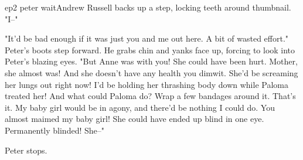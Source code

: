 \documentclass{book}
\begin{document}
\begin{childnode}{ep2 peter wait}{Andrew Russell}
    \name{} backs up a step, locking \hisher{} teeth around \hisher{} thumbnail. "I--"

    "It'd be bad enough if it was just you and me out here. A bit of wasted effort." Peter's boots step forward. He grabs \names{} chin and yanks \hisher{} face up, forcing \himher{} to look into 
    Peter's blazing eyes. "But Anne was with you! She could have been hurt. 
    Mother, she almost was! And she doesn't have any health you dimwit. She'd be screaming her lungs out right now! I'd be holding her thrashing body down while Paloma treated her! And what could Paloma do? Wrap a few bandages around it. That's it. My baby girl would 
    be in agony, and there'd be nothing I could do. You almost maimed my baby girl! She could have ended up blind in one eye. Permanently blinded! She--"
    
    Peter stops. 



\end{childnode}
\end{document}
